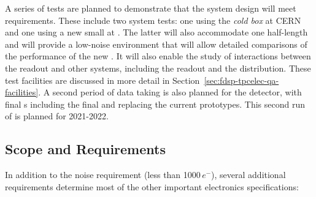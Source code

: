 A series of tests are planned to demonstrate that the  system design will meet  requirements. These include two system tests: one using the  \textit{cold box} at CERN and one using a new small  at \fnal. The latter will also accommodate one half-length   and will provide a low-noise environment that will allow detailed comparisons of the performance of the new . It will also enable the study of interactions between the  readout and other systems, including the  readout and the  distribution. These test facilities are discussed in more detail in Section~\ref{sec:fdsp-tpcelec-qa-facilities}. A second period of data taking is also planned for the  detector, with final s including the final  and  replacing the current prototypes. This second run of  is planned for 2021-2022.


\subsection{Scope and Requirements}
\label{sec:fdsp-tpcelec-overview-scope}

In addition to the noise requirement (less than \num{1000}\,$e^{-}$), several additional requirements determine most of the other important  electronics specifications:  

